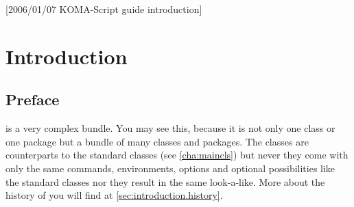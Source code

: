 %
%
%
%
%
%
%
%
% 
%
%
%
%

[2006/01/07 KOMA-Script guide introduction]

\chapter{Introduction}

\section{Preface}\label{sec:introduction.preface}

{\KOMAScript} is a very complex bundle. You may see this, because it
is not only one class or one package but a bundle of many classes and
packages. The classes are counterparts to the standard classes (see
\autoref{cha:maincls}) but never they come with only the same
commands, environments, options and optional possibilities like the
standard classes nor they result in the same look-a-like. More about
the history of \KOMAScript{} you will find at
\autoref{sec:introduction.history}.

